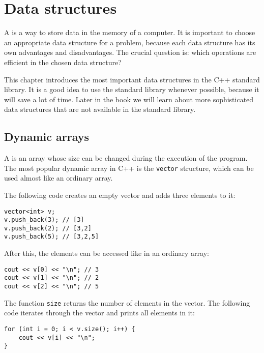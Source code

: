 \chapter{Data structures}


A  is a way to store
data in the memory of a computer.
It is important to choose an appropriate
data structure for a problem,
because each data structure has its own
advantages and disadvantages.
The crucial question is: which operations
are efficient in the chosen data structure?

This chapter introduces the most important
data structures in the C++ standard library.
It is a good idea to use the standard library
whenever possible,
because it will save a lot of time.
Later in the book we will learn about more sophisticated
data structures that are not available
in the standard library.

\section{Dynamic arrays}


A  is an array whose
size can be changed during the execution
of the program.
The most popular dynamic array in C++ is
the \texttt{vector} structure,
which can be used almost like an ordinary array.

The following code creates an empty vector and
adds three elements to it:

\begin{lstlisting}
vector<int> v;
v.push_back(3); // [3]
v.push_back(2); // [3,2]
v.push_back(5); // [3,2,5]
\end{lstlisting}

After this, the elements can be accessed like in an ordinary array:

\begin{lstlisting}
cout << v[0] << "\n"; // 3
cout << v[1] << "\n"; // 2
cout << v[2] << "\n"; // 5
\end{lstlisting}

The function \texttt{size} returns the number of elements in the vector.
The following code iterates through
the vector and prints all elements in it:

\begin{lstlisting}
for (int i = 0; i < v.size(); i++) {
    cout << v[i] << "\n";
}
\end{lstlisting}

